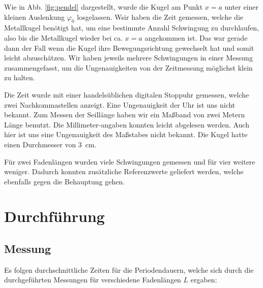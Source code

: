 \documentclass[11pt,a4paper,titlepage, ngerman]{article}
\begin{document}
		Wie in Abb. \ref{fig:pendel} dargestellt, wurde die Kugel am Punkt $x = a$ unter einer kleinen Auslenkung $\varphi_0$ losgelassen.
		Wsir haben die Zeit gemessen, welche die Metallkugel benötigt hat, um eine bestimmte Anzahl Schwingung zu durchlaufen, also bis die Metallkugel wieder bei ca. $x = a$ angekommen ist.
		Das war gerade dann der Fall wenn die Kugel ihre Bewegungsrichtung gewechselt hat und somit leicht abzuschätzen.
		Wir haben jeweils mehrere Schwingungen in einer Messung zusammengefasst, um die Ungenauigkeiten von der Zeitmessung möglichst klein zu halten. 
		
		Die Zeit wurde mit einer handelsüblichen digitalen Stoppuhr gemessen, welche zwei Nachkommastellen anzeigt.
		Eine Ungenauigkeit der Uhr ist uns nicht bekannt.
		Zum Messen der Seillänge haben wir ein Maßband von zwei Metern Länge benutzt. Die Millimeter-angaben konnten leicht abgelesen werden.
		Auch hier ist uns eine Ungenauigkeit des Maßstabes nicht bekannt.
		Die Kugel hatte einen Durchmesser von \SI{3}{\cm}.
		
		Für zwei Fadenlängen wurden viele Schwingungen gemessen und für vier weitere weniger.
		Dadurch konnten zusätzliche Referenzwerte geliefert werden, welche ebenfalls gegen die Behauptung gehen.
		
	\section{Durchführung}
		\label{Durchführung}
		
		
		\subsection{Messung}
		\label{Messung}
			Es folgen durchschnittliche Zeiten für die Periodendauern, welche sich durch die durchgeführten Messungen für verschiedene Fadenlängen $L$ ergaben: 
			\vspace{0.25cm} 
			
\end{document}
